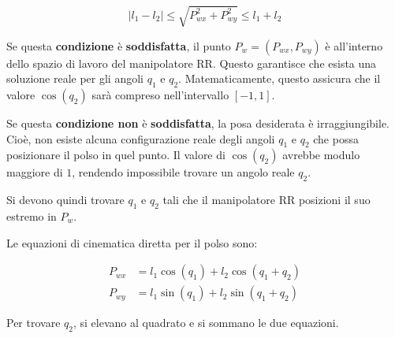 \documentclass[11pt, a4paper]{article}
\begin{document}
\[
    |l_1 -l_2 |\le \sqrt{P_{wx}^2 +P_{wy}^2 }\le l_1 +l_2
\]

\begin{par}
\begin{flushleft}
Se questa \textbf{condizione} è \textbf{soddisfatta}, il punto $P_w = (P_{wx}, P_{wy})$ è all'interno dello spazio di lavoro del manipolatore RR. Questo garantisce che esista una soluzione reale per gli angoli $q_1$ e $q_2$. Matematicamente, questo assicura che il valore $\cos (q_2 )$ sarà compreso nell'intervallo $[-1,1]$.
\end{flushleft}
\end{par}

\begin{par}
\begin{flushleft}
Se questa \textbf{condizione non} è \textbf{soddisfatta}, la posa desiderata è irraggiungibile. Cioè, non esiste alcuna configurazione reale degli angoli $q_1$ e $q_2$ che possa posizionare il polso in quel punto. Il valore di $\cos (q_2 )$ avrebbe modulo maggiore di $1$, rendendo impossibile trovare un angolo reale $q_2$.
\end{flushleft}
\end{par}

\begin{par}
\begin{flushleft}
Si devono quindi trovare $q_1$ e $q_2$ tali che il manipolatore RR posizioni il suo estremo in $P_w$.
\end{flushleft}
\end{par}
\newpage
{}

\begin{par}
\begin{flushleft}
Le equazioni di cinematica diretta per il polso sono:
\end{flushleft}
\end{par}

\[
\begin{aligned}
    P_{wx} &= l_1 \cos(q_1) + l_2 \cos(q_1 + q_2) \\
    P_{wy} &= l_1 \sin(q_1) + l_2 \sin(q_1 + q_2)
\end{aligned}
\]

\begin{par}
\begin{flushleft}
Per trovare $q_2$, si elevano al quadrato e si sommano le due equazioni.
\end{flushleft}
\end{par}
\end{document}
